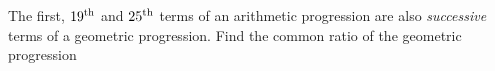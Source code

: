 
%
%
%
%      
% 
% 
%   



\gcalcexpr[0]
\gcalcexpr[0]
\gcalcexpr[0]\tr{\vbtwo - \vbone}

\question The first, $19^\text{th}$ and $25^\text{th}$ terms of an arithmetic progression are also 
\textit{successive} terms of a geometric progression. Find the common ratio of the geometric progression

\insertQR[-10pt]{}

